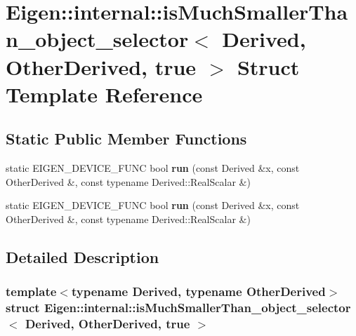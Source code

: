 \hypertarget{struct_eigen_1_1internal_1_1is_much_smaller_than__object__selector_3_01_derived_00_01_other_derived_00_01true_01_4}{}\section{Eigen\+:\+:internal\+:\+:is\+Much\+Smaller\+Than\+\_\+object\+\_\+selector$<$ Derived, Other\+Derived, true $>$ Struct Template Reference}
\label{struct_eigen_1_1internal_1_1is_much_smaller_than__object__selector_3_01_derived_00_01_other_derived_00_01true_01_4}
\subsection*{Static Public Member Functions}
\begin{DoxyCompactItemize}
\item 
\mbox{\label{struct_eigen_1_1internal_1_1is_much_smaller_than__object__selector_3_01_derived_00_01_other_derived_00_01true_01_4_a95e0de15531450f2a0b780af2782bacc}} 
static E\+I\+G\+E\+N\+\_\+\+D\+E\+V\+I\+C\+E\+\_\+\+F\+U\+NC bool {\bfseries run} (const Derived \&x, const Other\+Derived \&, const typename Derived\+::\+Real\+Scalar \&)
\item 
\mbox{\label{struct_eigen_1_1internal_1_1is_much_smaller_than__object__selector_3_01_derived_00_01_other_derived_00_01true_01_4_a95e0de15531450f2a0b780af2782bacc}} 
static E\+I\+G\+E\+N\+\_\+\+D\+E\+V\+I\+C\+E\+\_\+\+F\+U\+NC bool {\bfseries run} (const Derived \&x, const Other\+Derived \&, const typename Derived\+::\+Real\+Scalar \&)
\end{DoxyCompactItemize}


\subsection{Detailed Description}
\subsubsection*{template$<$typename Derived, typename Other\+Derived$>$\newline
struct Eigen\+::internal\+::is\+Much\+Smaller\+Than\+\_\+object\+\_\+selector$<$ Derived, Other\+Derived, true $>$}



